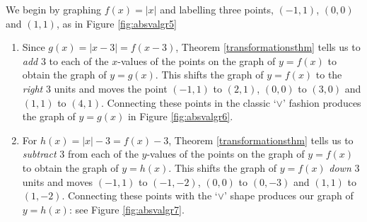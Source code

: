 {
We begin by graphing $f(x) = |x|$ and labelling three points, $(-1,1)$, $(0,0)$ and $(1,1)$, as in Figure \ref{fig:absvalgr5}


\begin{enumerate}

\item Since $g(x) = |x-3| = f(x-3)$, Theorem \ref{transformationsthm} tells us to \textit{add} $3$ to each of the $x$-values of the points on the graph of $y=f(x)$ to obtain the graph of $y=g(x)$.   This shifts the graph of $y=f(x)$ to the \textit{right} $3$ units and moves the point $(-1,1)$ to $(2,1)$,  $(0,0)$ to $(3,0)$ and $(1,1)$ to $(4,1)$.  Connecting these points in the classic `$\vee$' fashion produces the graph of $y = g(x)$ in Figure \ref{fig:absvalgr6}.


\item For $h(x) = |x| - 3 = f(x) -3$, Theorem \ref{transformationsthm} tells us to \textit{subtract} $3$ from each of the $y$-values of the points on the graph of $y=f(x)$ to obtain the graph of $y = h(x)$.  This shifts the graph of $y=f(x)$ \textit{down} $3$ units and moves $(-1,1)$ to $(-1,-2)$, $(0,0)$ to $(0,-3)$ and $(1,1)$ to $(1,-2)$.  Connecting these points with the `$\vee$' shape produces our graph of $y=h(x)$: see Figure \ref{fig:absvalgr7}.



\end{enumerate}}
